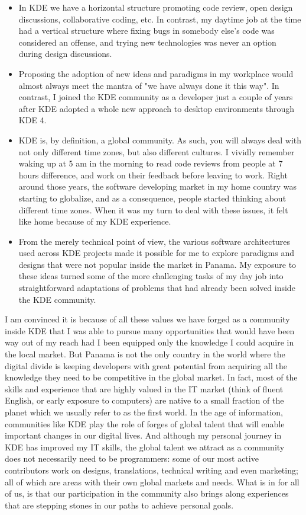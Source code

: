 \begin{itemize}
\item In KDE we have a horizontal structure promoting code review,
  open design discussions, collaborative coding, etc. In contrast, my
  daytime job at the time had a vertical structure where fixing bugs
  in somebody else's code was considered an offense, and trying new
  technologies was never an option during design discussions.
\item Proposing the adoption of new ideas and paradigms in my
  workplace would almost always meet the mantra of "we have always
  done it this way". In contrast, I joined the KDE community as a
  developer just a couple of years after KDE adopted a whole new
  approach to desktop environments through KDE 4.
\item KDE is, by definition, a global community. As such, you will
  always deal with not only different time zones, but also different
  cultures. I vividly remember waking up at 5 am in the morning to
  read code reviews from people at 7 hours difference, and work on
  their feedback before leaving to work. Right around those years, the
  software developing market in my home country was starting to
  globalize, and as a consequence, people started thinking about
  different time zones. When it was my turn to deal with these issues,
  it felt like home because of my KDE experience.
\item From the merely technical point of view, the various software
  architectures used across KDE projects made it possible for me to
  explore paradigms and designs that were not popular inside the
  market in Panama. My exposure to these ideas turned some of the more
  challenging tasks of my day job into straightforward adaptations of
  problems that had already been solved inside the KDE community.
\end{itemize}

\par
I am convinced it is because of all these values we have forged
as a community inside KDE that I was able to pursue many opportunities
that would have been way out of my reach had I been equipped only the
knowledge I could acquire in the local market. But Panama is not the
only country in the world where the digital divide is keeping
developers with great potential from acquiring all the knowledge they
need to be competitive in the global market. In fact, most of the
skills and experience that are highly valued in the IT market (think
of fluent English, or early exposure to computers) are native to a
small fraction of the planet which we usually refer to as the first
world. In the age of information, communities like KDE play the role
of forges of global talent that will enable important changes in our
digital lives. And although my personal journey in KDE has improved my
IT skills, the global talent we attract as a community does not
necessarily need to be programmers: some of our most active
contributors work on designs, translations, technical writing and even
marketing; all of which are areas with their own global markets and
needs. What is in for all of us, is that our participation in the
community also brings along experiences that are stepping stones in
our paths to achieve personal goals.

